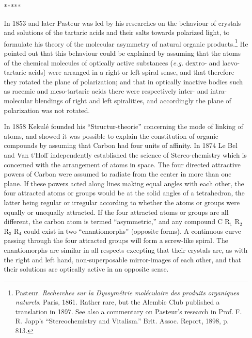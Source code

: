 \documentclass[a4paper, 12pt, oneside]{article}
\begin{document}
\centerline{*\hspace{15mm}*\hspace{15mm}*\hspace{15mm}*\hspace{15mm}*}
\bigskip

In 1853 and later Pasteur was led by his researches on the behaviour of crystals and solutions of the tartaric acids and their salts towards polarized light, to formulate his theory of the molecular asymmetry of natural organic products.\footnote{Pasteur. \emph{Recherches sur la Dyssymétrie moléculaire des produits organiques naturels}. Paris, 1861. Rather rare, but the Alembic Club published a translation in 1897. See also a commentary on Pasteur's research in Prof. F. R. Japp's ``Stereochemistry and Vitalism.'' Brit. Assoc. Report, 1898, p. 813.} He pointed out that this behaviour could be explained by assuming that the atoms of the chemical molecules of optically active substances (\emph{e.g.} dextro- and laevo-tartaric acids) were arranged in a right or left spiral sense, and that therefore they rotated the plane of polarization; and that in optically inactive bodies such as racemic and meso-tartaric acids there were respectively inter- and intra-molecular blendings of right and left spiralities, and accordingly the plane of polarization was not rotated.

In 1858 Kekulé founded his ``Structur-theorie'' concerning the mode of linking of atoms, and showed it was possible to explain the constitution of organic compounds by assuming that Carbon had four units of affinity. In 1874 Le Bel and Van t'Hoff independently established the science of Stereo-chemistry which is concerned with the arrangement of atoms in space. The four directed attractive powers of Carbon were assumed to radiate from the center in more than one plane. If these powers acted along lines making equal angles with each other, the four attracted atoms or groups would be at the solid angles of a tetrahedron, the latter being regular or irregular according to whether the atoms or groups were equally or unequally attracted. If the four attracted atoms or groups are all different, the carbon atom is termed ``asymmetric,'' and any compound C R$_{1}$ R$_{2}$ R$_{3}$ R$_{4}$ could exist in two ``enantiomorphs'' (opposite forms). A continuous curve passing through the four attracted groups will form a screw-like spiral. The enantiomorphs are similar in all respects excepting that their crystals are, as with the right and left hand, non-superposable mirror-images of each other, and that their solutions are optically active in an opposite sense.
\end{document}
